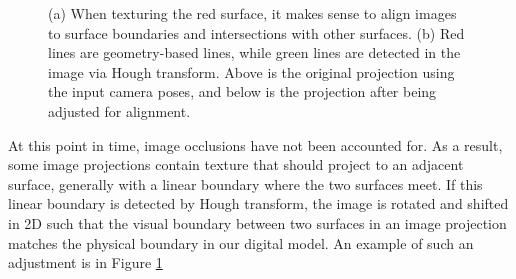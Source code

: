 \documentclass[]{spie}  %
\begin{document}
\begin{figure}
  \centering
  \caption{(a) When texturing the red surface, it makes sense to align
    images to surface boundaries and intersections with other
    surfaces. (b) Red lines are geometry-based lines, while green
    lines are detected in the image via Hough transform. Above is the
    original projection using the input camera poses, and below is the
    projection after being adjusted for alignment.}
  \label{fig:geometryAlignment}
\end{figure}


At this point in time, image occlusions have not been accounted
for. As a result, some image projections contain texture that should
project to an adjacent surface, generally with a linear boundary where
the two surfaces meet. If this linear boundary is detected by Hough
transform, the image is rotated and shifted in 2D such that the visual
boundary between two surfaces in an image projection matches the
physical boundary in our digital model. An example of such an
adjustment is in Figure \ref{fig:geometryAlignment}
\end{document}
